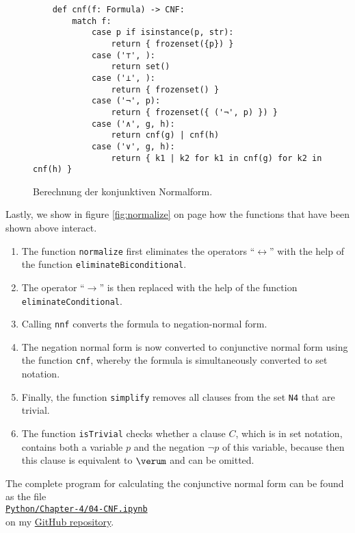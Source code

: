 \begin{figure}[!ht]
  \centering
\begin{verbatim}
    def cnf(f: Formula) -> CNF:
        match f:
            case p if isinstance(p, str):         
                return { frozenset({p}) }
            case ('⊤', ):
                return set()
            case ('⊥', ):
                return { frozenset() }
            case ('¬', p):
                return { frozenset({ ('¬', p) }) }
            case ('∧', g, h):
                return cnf(g) | cnf(h)
            case ('∨', g, h):
                return { k1 | k2 for k1 in cnf(g) for k2 in cnf(h) }
\end{verbatim}
\vspace*{-0.3cm}
  \caption{Berechnung der konjunktiven Normalform. }
  \label{fig:cnf}
\end{figure}
Lastly, we show in figure \ref{fig:normalize} on page \pageref{fig:normalize}
how the functions that have been shown above interact.
\begin{enumerate}
\item The function \texttt{normalize} first eliminates the operators ``$\leftrightarrow$''
       with the help of the function \linebreak
      \texttt{eliminateBiconditional}.
\item The operator ``$\rightarrow$'' is then replaced with the help of the function
      \texttt{eliminateConditional}.
\item Calling \texttt{nnf} converts the formula to negation-normal form.
\item The negation normal form is now converted to conjunctive normal form using the function \texttt{cnf},
      whereby the formula is simultaneously converted to set notation.  
\item Finally, the function \texttt{simplify} removes all clauses from the set \texttt{N4} that are trivial.
\item The function \texttt{isTrivial} checks whether a clause $C$, which is in set notation,
      contains both a variable $p$ and the negation $\neg p$ of this variable, because then this
      clause is equivalent to $\verum$ and can be omitted.
\end{enumerate}
The complete program for calculating the conjunctive normal form can be found as the file
\\[0.2cm]
\hspace*{1.3cm}
\href{https://github.com/karlstroetmann/Logic/blob/master/Python/Chapter-4/04-CNF.ipynb}{\texttt{Python/Chapter-4/04-CNF.ipynb}} 
\\[0.2cm]
on my \href{https://github.com/karlstroetmann/Logic}{GitHub repository}.


